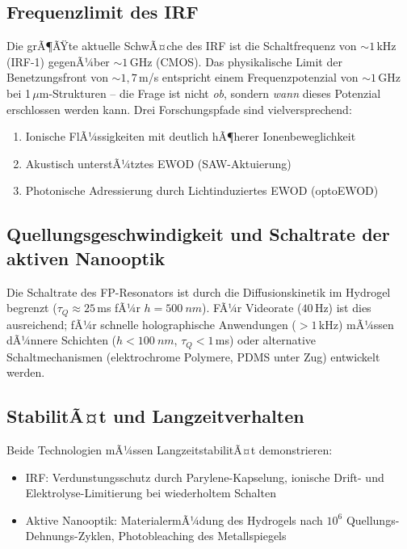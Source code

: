 ﻿\documentclass[a4paper,12pt]{scrreprt}
\theoremstyle{definition}
\begin{document}
\subsection{Frequenzlimit des IRF}

Die grÃ¶ÃŸte aktuelle SchwÃ¤che des IRF ist die Schaltfrequenz von $\sim 1$\,kHz
(IRF-1) gegenÃ¼ber $\sim 1$\,GHz (CMOS). Das physikalische Limit der
Benetzungsfront von $\sim 1{,}7$\,m/s entspricht einem Frequenzpotenzial
von $\sim 1$\,GHz bei 1\,$\mu$m-Strukturen -- die Frage ist nicht \emph{ob},
sondern \emph{wann} dieses Potenzial erschlossen werden kann. Drei Forschungspfade
sind vielversprechend:
\begin{enumerate}
  \item Ionische FlÃ¼ssigkeiten mit deutlich hÃ¶herer Ionenbeweglichkeit
  \item Akustisch unterstÃ¼tztes EWOD (SAW-Aktuierung)
  \item Photonische Adressierung durch Lichtinduziertes EWOD (optoEWOD)
\end{enumerate}

\subsection{Quellungsgeschwindigkeit und Schaltrate der aktiven Nanooptik}

Die Schaltrate des FP-Resonators ist durch die Diffusionskinetik im Hydrogel
begrenzt ($\tau_Q \approx 25$\,ms fÃ¼r $h = \SI{500}{nm}$). FÃ¼r Videorate
($40$\,Hz) ist dies ausreichend; fÃ¼r schnelle holographische Anwendungen
($> 1$\,kHz) mÃ¼ssen dÃ¼nnere Schichten ($h < \SI{100}{nm}$, $\tau_Q < 1$\,ms)
oder alternative Schaltmechanismen (elektrochrome Polymere, PDMS unter Zug)
entwickelt werden.

\subsection{StabilitÃ¤t und Langzeitverhalten}

Beide Technologien mÃ¼ssen LangzeitstabilitÃ¤t demonstrieren:
\begin{itemize}
  \item IRF: Verdunstungsschutz durch Parylene-Kapselung, ionische Drift-
    und Elektrolyse-Limitierung bei wiederholtem Schalten
  \item Aktive Nanooptik: MaterialermÃ¼dung des Hydrogels nach $10^6$
    Quellungs-Dehnungs-Zyklen, Photobleaching des Metallspiegels
\end{itemize}
\end{document}

